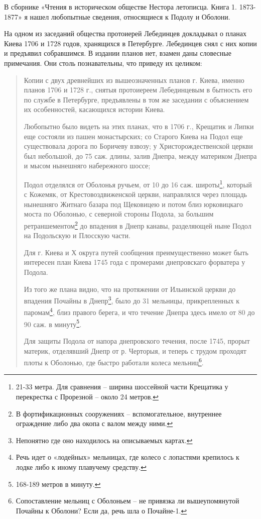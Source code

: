 В сборнике «Чтения в историческом обществе Нестора летописца. Книга 1. 1873-1877» я нашел любопытные сведения, относящиеся к Подолу и Оболони. 

На одном из заседаний общества протоиерей Лебединцев докладывал о планах Киева 1706 и 1728 годов, хранящихся в Петербурге. Лебединцев снял с них копии и предъявил собравшимся. В издании планов нет, взамен даны словесные примечания. Они столь познавательны, что приведу их целиком:

\begin{quotation}
Копии с двух древнейших из вышеозначенных планов г. Киева, именно планов 1706 и 1728 г., снятыя протоиереем Лебединцевым в бытность его по службе в Петербурге, предъявлены в том же заседании с объяснением их особенностей, касающихся истории Киева.

Любопытно было видеть на этих планах, что в 1706 г., Крещатик и Липки еще состояли из пашен монастырских; со Старого Киева на Подол еще существовала дорога по Боричеву взвозу; у Христорождественской церкви был небольшой, до 75 саж. длины, залив Днепра, между материком Днепра и мысом нынешняго набережного шоссе;

Подол отделялся от Оболонья ручьем, от 10 до 16 саж. широты\footnote{21-33 метра. Для сравнения – ширина шоссейной части Крещатика у перекрестка с Прорезной – около 24 метров.}, который с Кожемяк, от Крестовоздвиженской церкви, направлялся через площадь нынешняго Житнаго базара под Щековицею и потом близ юрковицкаго моста по Оболонью, с северной стороны Подола, за большим ретраншементом\footnote{В фортификационных сооружениях – вспомогательное, внутреннее ограждение либо два окопа с валом между ними.} до впадения в Днепр канавы, разделяющей ныне Подол на Подольскую и Плосскую части.

Для г. Киева и Х округа путей сообщения преимущественно может быть интересен план Киева 1745 года с промерами днепровскаго форватера у Подола. 

Из того же плана видно, что на протяжении от Ильинской церкви до впадения Почайны в Днепр\footnote{Непонятно где оно находилось на описываемых картах.}, было до 31 мельницы, прикрепленных к паромам\footnote{Речь идет о «лодейных» мельницах, где колесо с лопастями крепилось к лодке либо к иному плавучему средству.}, близ правого берега, и что течение Днепра здесь имело от 80 до 90 саж. в минуту\footnote{168-189 метров в минуту.}. 

Для защиты Подола от напора днепровского течения, после 1745, прорыт материк, отделявший Днепр от р. Черторыя, и теперь с трудом проходят плоты к Оболонью, где быстро работали колеса мельниц\footnote{Сопоставление мельниц с Оболоньем – не привязка ли вышеупомянутой Почайны к Оболони? Если да, речь шла о Почайне-1.}.
\end{quotation}

